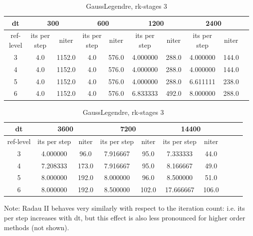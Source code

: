 \documentclass[a4paper, 12pt]{article}
\begin{document}
\begin{table}[h]\centering
\begin{scriptsize}
\begin{tabular}{c|c|c|c|c|c|c|c|c|c}
\multicolumn{0}{c|}{dt} &
\multicolumn{2}{c|}{300} &
\multicolumn{2}{c|}{600} &
\multicolumn{2}{c|}{1200} &
\multicolumn{2}{c|}{2400}
\\ \hline\hline
ref-level &   its per step &   niter & its per step &   niter & its per step &   niter & its per step &   niter\\ \hline
        3 &      4.0  &      1152.0 &            4.0 &   576.0 &       4.000000 &   288.0 &       4.000000 &   144.0\\
        4 &      4.0  &      1152.0 &            4.0 &   576.0 &       4.000000 &   288.0 &       4.000000 &   144.0\\
        5 &      4.0  &      1152.0 &            4.0 &   576.0 &       4.000000 &   288.0 &       6.611111 &   238.0\\
        6 &      4.0  &      1152.0 &            4.0 &   576.0 &       6.833333 &   492.0 &       8.000000 &   288.0
\end{tabular}
\bigskip

\begin{tabular}{c|c|c|c|c|c|c|c|c|c}
\multicolumn{0}{c|}{dt} &
\multicolumn{2}{c|}{3600} &
\multicolumn{2}{c|}{7200} &
\multicolumn{2}{c|}{14400}
\\ \hline\hline
ref-level &   its per step &   niter & its per step &   niter & its per step &   niter  \\ \hline
       3 &      4.000000  & 96.0 &       7.916667  & 95.0 &    7.333333 &  44.0\\
       4 &      7.208333  & 173.0 &      7.916667  & 95.0 &    8.166667 &  49.0\\
       5 &      8.000000  & 192.0 &      8.000000  & 96.0 &    8.500000 &  51.0\\
       6 &      8.000000  & 192.0 &      8.500000  &102.0 &   17.666667 & 106.0
\end{tabular}
\caption{GaussLegendre, rk-stages 3}
\label{tab_niter_vs_spatial}
\end{scriptsize}
\end{table}


Note: Radau II behaves very similarly with respect to the iteration count: i.e.
its per step increases with dt, but this effect is also less pronounced for higher
order methods (not shown).
\end{document}
